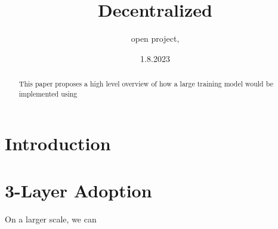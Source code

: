 \documentclass{article}
\title{Decentralized }
\author{open project, }
\date{1.8.2023}
\begin{document}
\maketitle

\begin{abstract}
  This paper proposes a high level overview of how a large training model would be implemented using 
\end{abstract}

\section{Introduction}

\section{3-Layer Adoption   }

On a larger scale, we can 
\end{document}
